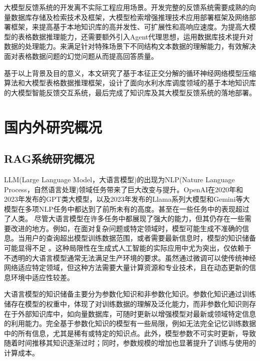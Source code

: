 大模型反馈系统的开发离不实际工程应用场景。开发完整的反馈系统需要成熟的向量数据库存储及检索技术及框架，大模型检索增强推理技术应用部署框架及网络部署框架，来提高基于本地知识库的高并发性、可扩展性和高响应速度。为提高大模型的表格数据推理能力，还需要额外引入Agent代理思想，运用数据库技术提升对数据的处理能力。来满足针对特殊场景下不同结构文本数据的理解能力，有效解决面对表格数据问题的幻觉问题从而提高回答质量。

基于以上背景及目的意义，本文研究了基于本征正交分解的循环神经网络模型压缩算法和大模型表格数据推理框架，设计了面向水利水库调度领域的基于本地知识库的大模型智能反馈交互系统，最后完成了知识库及其大模型反馈系统的落地部署。



\section{国内外研究概况}
\subsection{RAG系统研究概况}
LLM(Large Language Model，大语言模型)\cite{kuzmanChatGPTBeginningEnd2023,heAnnoLLMMakingLarge2023,weiFinetunedLanguageModels2022,chenLabelfreeNodeClassification2023,chungScalingInstructionFinetunedLanguage2022,xuWizardLMEmpoweringLarge2023}的出现为NLP(Nature Language Process，自然语言处理)领域任务带来了巨大改变与提升。OpenAI在2020年和2023年发布的GPT类大模型\cite{kuzmanChatGPTBeginningEnd2023,floridiGPT3ItsNature2020}，以及2023年发布的Llama\cite{touvronLLaMAOpenEfficient2023}系列大模型和Gemini\cite{teamGeminiFamilyHighly2024}等大模型在多项NLP任务中都达到了前所未有的高度。甚至在一些任务中的表现超过了人类\cite{luFiniteLayerNeural2020,hendrycksMeasuringMassiveMultitask2021}。
尽管大语言模型在许多任务中都展现了强大的能力，但其仍存在一些需要改进的地方。例如，在面对复杂问题或特定领域时，模型可能生成不准确的信息\cite{zhangHowLargeLanguage2023}。当用户的查询超出模型训练数据范围，或者需要最新信息时，模型的知识储备可能显得不足 \cite{kandpalLargeLanguageModels2023}。这种局限性在生成式人工智能的实际应用中尤为突出，仅依赖于不透明的大语言模型通常无法满足生产环境的要求。虽然通过微调可以使传统神经网络适应特定领域，但这种方法需要大量计算资源和专业技术，且在动态更新的信息环境中适应性较差。

大语言模型的知识储备主要分为参数化知识和非参数化知识。参数化知识通过训练储存在模型的权重中，体现了对训练数据的理解及泛化能力，而非参数化知识则存在于外部知识库中，如向量数据库，可随时更新以增强模型对最新或领域特定信息的利用能力。完全基于参数化知识的模型有一些局限，例如无法完全记忆训练数据中的所有信息，尤其是稀有或特定的知识点。此外，模型参数不可实时更新，导致随着时间推移其知识逐渐过时；同时，参数规模的增加也显著提升了训练与使用的计算成本。

